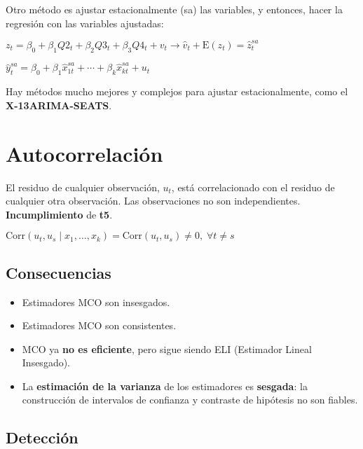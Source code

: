 \documentclass[10pt, a4paper, landscape]{article}
\newcommand{\E}{\mathrm{E}}
\newcommand{\Corr}{\mathrm{Corr}}
\begin{document}
\begin{multicols}{3}
		Otro método es ajustar estacionalmente (sa) las variables, y entonces, hacer la regresión con las variables ajustadas:
		
		\begin{center}
			$z_{t} = \beta_{0} + \beta_{1} Q2_{t} + \beta_{2} Q3_{t} + \beta_{3} Q4_{t} + v_{t} \rightarrow \hat{v}_{t} + \E(z_{t}) = \hat{z}_{t}^{sa}$
			
			$\hat{y}_{t}^{sa}= \beta_{0} + \beta_{1} \hat{x}_{1t}^{sa} + \cdots + \beta_{k} \hat{x}_{kt}^{sa} + u_{t}$
		\end{center}
		
		Hay métodos mucho mejores y complejos para ajustar estacionalmente, como el \textbf{X-13ARIMA-SEATS}.
		
		\columnbreak
		
		\section*{Autocorrelación}
		
		El residuo de cualquier observación, $u_{t}$, está correlacionado con el residuo de cualquier otra observación. Las observaciones no son independientes. \textbf{Incumplimiento} de \textbf{t5}.
		
		\begin{center}
			$\Corr(u_{t}, u_{s} \mid x_{1}, \ldots, x_{k}) = \Corr(u_{t}, u_{s}) \neq 0, \; \forall t \neq s$
		\end{center}
		
		\subsection*{Consecuencias}
		
		\begin{itemize}[leftmargin=*]
			\item Estimadores MCO son insesgados.
			\item Estimadores MCO son consistentes.
			\item MCO ya \textbf{no es eficiente}, pero sigue siendo ELI (Estimador Lineal Insesgado).
			\item La \textbf{estimación de la varianza} de los estimadores es \textbf{sesgada}: la construcción de intervalos de confianza y contraste de hipótesis no son fiables.
		\end{itemize}
		
		\subsection*{Detección}
		

\end{multicols}
\end{document}
